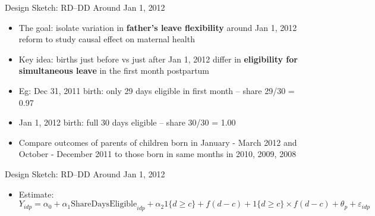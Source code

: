 \documentclass[11pt,notes=hide,aspectratio=169,mathserif]{beamer}
\begin{document}
\begin{frame}{Design Sketch: RD–DD Around Jan 1, 2012}
\small
\begin{itemize}
  \item The goal: isolate variation in \textbf{father's leave flexibility} around Jan 1, 2012 reform to study causal effect on maternal health
  \item Key idea: births just before vs just after Jan 1, 2012 differ in \textbf{eligibility for simultaneous leave} in the first month postpartum
  \item Eg: Dec 31, 2011 birth: only 29 days eligible in first month -- share 29/30 = 0.97 \\
  \item Jan 1, 2012 birth: full 30 days eligible -- share 30/30 = 1.00
  \item Compare outcomes of parents of children born in January - March 2012 and October - December 2011 to those born in same months in 2010, 2009, 2008
\end{itemize}
\end{frame}

\begin{frame}{Design Sketch: RD–DD Around Jan 1, 2012}
\small
\begin{itemize}
  \item Estimate:
  \[
  Y_{idp} = \alpha_0 + \alpha_1 \textrm{ShareDaysEligible}_{idp} + \alpha_2 1\{d \geq c\} + f(d-c) + 1\{d \geq c\} \times f(d-c) + \theta_p + \varepsilon_{idp}
  \]
\end{itemize}
\end{frame}
\end{document}

